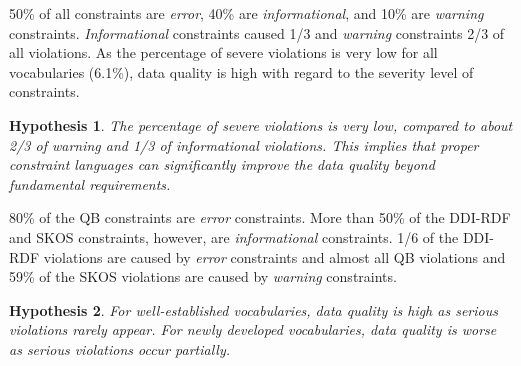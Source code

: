 \documentclass[conference]{IEEEtran}
\newtheorem{hyp}{Hypothesis}
\begin{document}

50\% of all constraints are \emph{error}, 40\% are \emph{informational}, and 10\% are \emph{warning} constraints.
\emph{Informational} constraints caused 1/3 and
\emph{warning} constraints 2/3 of all violations.
As the percentage of severe violations is very low for all vocabularies (6.1\%),
data quality is high with regard to the severity level of constraints.

\begin{hyp}
The percentage of severe violations is very low, compared to about 2/3 of warning and 1/3 of informational violations. This implies that proper constraint languages can significantly improve the data quality beyond fundamental requirements.
\end{hyp} 

80\% of the QB constraints are \emph{error} constraints.
More than 50\% of the DDI-RDF and SKOS constraints, however, are \emph{informational} constraints.
1/6 of the DDI-RDF violations are caused by \emph{error} constraints and
almost all QB violations and 59\% of the SKOS violations are caused by \emph{warning} constraints.  
\begin{hyp}
For well-established vocabularies, data quality is high as serious violations rarely appear. For newly developed vocabularies, data quality is worse as serious violations occur partially.   
\end{hyp} 
\end{document}
